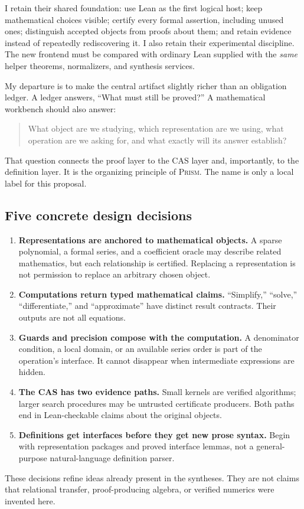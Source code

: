 \documentclass[11pt,a4paper]{article}
\newcommand{\prism}{\textsc{Prism}}
\theoremstyle{definition}
\theoremstyle{remark}
\begin{document}
I retain their shared foundation: use Lean as the first logical host; keep mathematical choices visible; certify every formal assertion, including unused ones; distinguish accepted objects from proofs about them; and retain evidence instead of repeatedly rediscovering it. I also retain their experimental discipline. The new frontend must be compared with ordinary Lean supplied with the \emph{same} helper theorems, normalizers, and synthesis services.

My departure is to make the central artifact slightly richer than an obligation ledger. A ledger answers, ``What must still be proved?'' A mathematical workbench should also answer:
\begin{quote}
What object are we studying, which representation are we using, what operation are we asking for, and what exactly will its answer establish?
\end{quote}
That question connects the proof layer to the CAS layer and, importantly, to the definition layer. It is the organizing principle of \prism. The name is only a local label for this proposal.

\subsection{Five concrete design decisions}
\begin{enumerate}
\item \textbf{Representations are anchored to mathematical objects.} A sparse polynomial, a formal series, and a coefficient oracle may describe related mathematics, but each relationship is certified. Replacing a representation is not permission to replace an arbitrary chosen object.
\item \textbf{Computations return typed mathematical claims.} ``Simplify,'' ``solve,'' ``differentiate,'' and ``approximate'' have distinct result contracts. Their outputs are not all equations.
\item \textbf{Guards and precision compose with the computation.} A denominator condition, a local domain, or an available series order is part of the operation's interface. It cannot disappear when intermediate expressions are hidden.
\item \textbf{The CAS has two evidence paths.} Small kernels are verified algorithms; larger search procedures may be untrusted certificate producers. Both paths end in Lean-checkable claims about the original objects.
\item \textbf{Definitions get interfaces before they get new prose syntax.} Begin with representation packages and proved interface lemmas, not a general-purpose natural-language definition parser.
\end{enumerate}
These decisions refine ideas already present in the syntheses. They are not claims that relational transfer, proof-producing algebra, or verified numerics were invented here.
\end{document}
